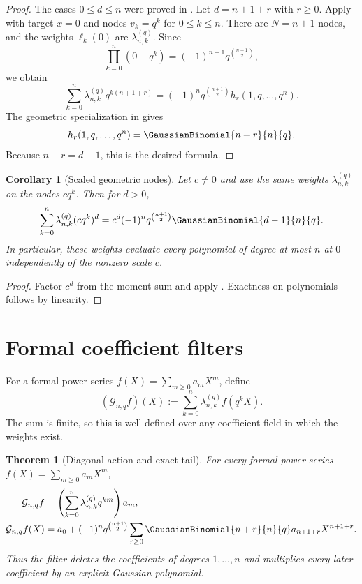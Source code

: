 \documentclass[11pt,a4paper,oneside,openany]{book}
\newtheorem{theorem}{Theorem}[chapter]
\newtheorem{corollary}[corollary]{Corollary}
\theoremstyle{definition}
\theoremstyle{remark}
\begin{document}
\begin{proof}
The cases $0\le d\le n$ were proved in .  Let $d=n+1+r$ with $r\ge0$.  Apply  with target $x=0$ and nodes
$v_k=q^k$ for $0\le k\le n$.  There are $N=n+1$ nodes, and the weights $\ell_k(0)$ are $\lambda_{n,k}^{(q)}$.  Since
\[
 \prod_{k=0}^{n}(0-q^k)=(-1)^{n+1}q^{\binom{n+1}{2}},
\]
we obtain
\[
 \sum_{k=0}^{n}\lambda_{n,k}^{(q)}q^{k(n+1+r)}
 =(-1)^nq^{\binom{n+1}{2}}h_r(1,q,\ldots,q^n).
\]
The geometric specialization in  gives
\[
 h_r(1,q,\ldots,q^n)=\GaussianBinomial{n+r}{n}{q}.
\]
Because $n+r=d-1$, this is the desired formula.
\end{proof}

\begin{corollary}[Scaled geometric nodes]\label{cor:scaled-geometric-moments}
Let $c\ne0$ and use the same weights $\lambda_{n,k}^{(q)}$ on the nodes $cq^k$.  Then for $d>0$,
\[
 \sum_{k=0}^{n}\lambda_{n,k}^{(q)}(cq^k)^d
 =c^d(-1)^nq^{\binom{n+1}{2}}\GaussianBinomial{d-1}{n}{q}.
\]
In particular, these weights evaluate every polynomial of degree at most $n$ at $0$ independently of the nonzero scale $c$.
\end{corollary}

\begin{proof}
Factor $c^d$ from the moment sum and apply .  Exactness on polynomials follows by linearity.
\end{proof}

\section{Formal coefficient filters}

For a formal power series $f(X)=\sum_{m\ge0}a_mX^m$, define
\begin{equation}\label{eq:geometric-filter-definition}
 (\mathcal G_{n,q}f)(X)
 :=\sum_{k=0}^{n}\lambda_{n,k}^{(q)}f(q^kX).
\end{equation}
The sum is finite, so this is well defined over any coefficient field in which the weights exist.

\begin{theorem}[Diagonal action and exact tail]\label{thm:geometric-filter-diagonal}
For every formal power series $f(X)=\sum_{m\ge0}a_mX^m$,
\begin{align}
 [X^m]\mathcal G_{n,q}f
 &=\left(\sum_{k=0}^{n}\lambda_{n,k}^{(q)}q^{km}\right)a_m,
 \label{eq:filter-diagonal}\\
 \mathcal G_{n,q}f(X)
 &=a_0+(-1)^nq^{\binom{n+1}{2}}
   \sum_{r\ge0}\GaussianBinomial{n+r}{n}{q}a_{n+1+r}X^{n+1+r}.
 \label{eq:filter-exact-tail}
\end{align}
Thus the filter deletes the coefficients of degrees $1,\ldots,n$ and multiplies every later coefficient by an explicit Gaussian polynomial.
\end{theorem}
\end{document}
